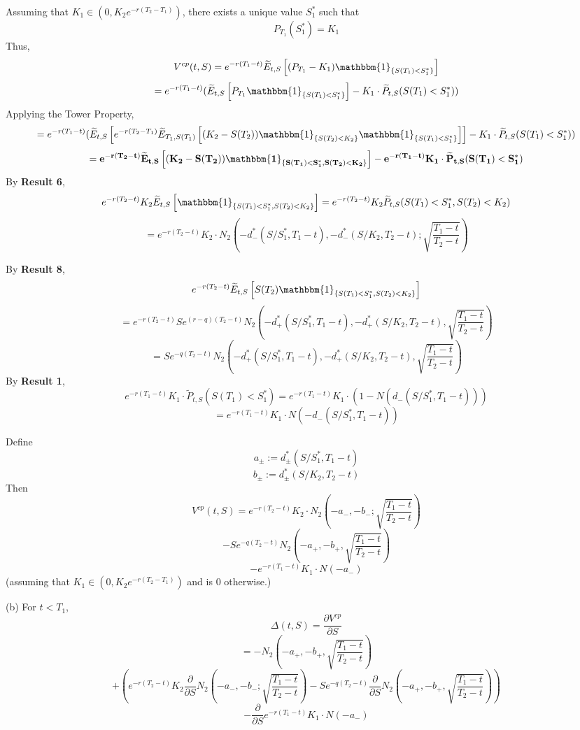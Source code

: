 \documentclass{article}[12pt,a4paper]
\begin{document}
\begin{enumerate}
  Assuming that $K_1 \in  (0,  K_2e^{-r(T_2 - T_1)})$, there exists a unique value $S_1^*$ 
  such that 
  $$P_{T_1}(S_1^*) = K_1$$
  Thus,
  $$V^{cp}(t,S) = e^{-r(T_1 - t)}\widetilde{E}_{t, S}\left[ (P_{T_1} - K_1) \mathbbm{1}_{\{ S(T_1) < S_1^* \}} \right]$$
  $$= e^{-r(T_1 - t)}( \widetilde{E}_{t, S}\left[ P_{T_1} \mathbbm{1}_{\{ S(T_1) < S_1^* \}}\right]
      -  K_1 \cdot \widetilde{P}_{t, S}(  S(T_1) < S_1^* ))$$
  Applying the Tower Property,
  $$=  e^{-r(T_1 - t)}(\widetilde{E}_{t, S}\left[ e^{-r(T_2 - T_1)} \widetilde{E}_{T_1, S(T_1)} 
  \left[ (K_2 - S(T_2)) \mathbbm{1}_{\{ S(T_2) < K_2 \}} \mathbbm{1}_{\{ S(T_1) < S_1^* \}} \right] \right]
  -  K_1 \cdot \widetilde{P}_{t, S}(  S(T_1) < S_1^* ))$$
  $$\mathbf{=  e^{-r(T_2 - t)}\widetilde{E}_{t, S}\left[ 
   (K_2 - S(T_2)) \mathbbm{1}_{\{ S(T_1) < S_1^*, S(T_2) < K_2 \}} \right]
  -  e^{-r(T_1 - t)} K_1 \cdot \widetilde{P}_{t, S}(  S(T_1) < S_1^* )}$$ \newline
  By \textbf{Result 6},
  $$e^{-r(T_2 - t)}K_2\widetilde{E}_{t, S}\left[  \mathbbm{1}_{\{ S(T_1) < S_1^*, S(T_2) < K_2 \}} \right]
  = e^{-r(T_2 - t)}K_2\widetilde{P}_{t, S}(S(T_1) < S_1^*, S(T_2) < K_2 )$$
  $$= e^{-r(T_2 - t)}K_2 \cdot N_2(-d_-^*(S/S_1^*, T_1 - t), -d_-^*(S/K_2, T_2 - t); \sqrt{\frac{T_1 - t}{T_2 - t}})$$
  
  By \textbf{Result 8},
  $$e^{-r(T_2 - t)}\widetilde{E}_{t, S}\left[ S(T_2) \mathbbm{1}_{\{ S(T_1) < S_1^*, S(T_2) < K_2 \}} \right]$$
  $$=e^{-r(T_2 - t)}Se^{(r - q)(T_2 - t)} N_2(-d_+^*(S/S_1^*, T_1 - t), -d_+^*(S/K_2,T_2 - t), \sqrt{\frac{T_1 - t}{T_2 - t}})$$
  $$= Se^{-q(T_2 - t)} N_2(-d_+^*(S/S_1^*, T_1 - t), -d_+^*(S/K_2,T_2 - t), \sqrt{\frac{T_1 - t}{T_2 - t}})$$
  By \textbf{Result 1},
  $$e^{-r(T_1 - t)} K_1 \cdot \widetilde{P}_{t, S}(  S(T_1) < S_1^* ) = e^{-r(T_1 - t)} K_1 \cdot (1 - N(d_-(S/S_1^*, T_1 - t)))$$
  $$=  e^{-r(T_1 - t)} K_1 \cdot N(-d_-(S/S_1^*, T_1 - t))$$
  
  \pagebreak
  
  \noindent Define
  $$a_\pm := d_\pm^*(S/S_1^*, T_1 - t)$$
  $$b_\pm := d_\pm^*(S/K_2, T_2 - t)$$
  Then
  $$V^{cp}(t,S) = e^{-r(T_2 - t)}K_2 \cdot N_2(-a_-, -b_-; \sqrt{\frac{T_1 - t}{T_2 - t}})$$ 
  $$- Se^{-q(T_2 - t)} N_2(-a_+, -b_+, \sqrt{\frac{T_1 - t}{T_2 - t}})$$ 
  $$- e^{-r(T_1 - t)} K_1 \cdot N(-a_-)$$
  \hfill (assuming that $K_1 \in  (0,  K_2e^{-r(T_2 - T_1)})$ and is $0$ otherwise.)
  
  (b) For $t < T_1$,
  $$\Delta(t, S) = \frac{\partial V^{cp}}{\partial S}$$
  $$ = - N_2(-a_+, -b_+, \sqrt{\frac{T_1 - t}{T_2 - t}})$$ 
  $$+ (e^{-r(T_2 - t)}K_2 \frac{\partial}{\partial S}N_2(-a_-, -b_-; \sqrt{\frac{T_1 - t}{T_2 - t}})
  - Se^{-q(T_2 - t)} \frac{\partial}{\partial S} N_2(-a_+, -b_+, \sqrt{\frac{T_1 - t}{T_2 - t}}))$$
  $$- \frac{\partial}{\partial S} e^{-r(T_1 - t)} K_1 \cdot N(-a_-)$$
  

\end{enumerate}
\end{document}
